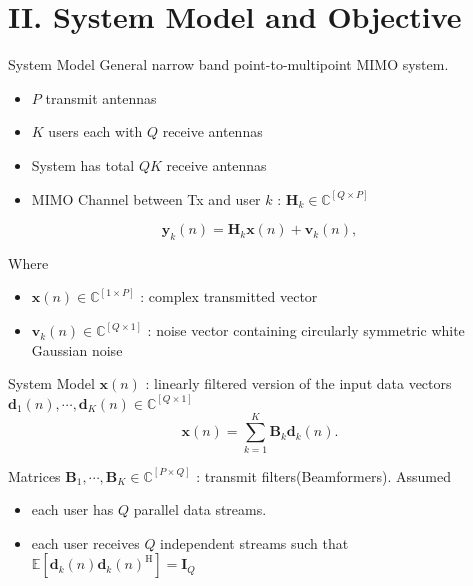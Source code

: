 \documentclass[aspectratio=169, 10pt]{beamer}
\begin{document}
\section{II. System Model and Objective}

\begin{frame}{System Model}
    General narrow band point-to-multipoint MIMO system.

    \begin{itemize}
        \item $P$ transmit antennas
        \item $K$ users each with $Q$ receive antennas
        \item System has total $QK$ receive antennas
        \item MIMO Channel between Tx and user $k$ : $\mathbf{H}_k \in \mathbb{C}^{[Q \times P]}$
    \end{itemize}

    \begin{equation}
        \mathbf{y}_k(n) = \mathbf{H}_k \mathbf{x}(n) + \mathbf{v}_k(n), \tag{1}
    \end{equation}

    Where
    \begin{itemize}
        \item $\mathbf{x}(n) \in \mathbb{C}^{[1\times P]}$ : complex transmitted vector
        \item $\mathbf{v}_k(n) \in \mathbb{C}^{[Q\times 1]}$
              : noise vector containing circularly symmetric white Gaussian noise
    \end{itemize}

\end{frame}

\begin{frame}{System Model}
    $\mathbf{x}(n)$ : linearly filtered version of the input data vectors
    $\mathbf{d}_1(n), \cdots , \mathbf{d}_K(n) \in \mathbb{C}^{[Q\times 1]}$
    \begin{equation}
        \mathbf{x}(n) = \sum_{k=1}^K \mathbf{B}_k \mathbf{d}_k(n). \tag{2}
    \end{equation}

    Matrices $\mathbf{B}_1, \cdots , \mathbf{B}_K \in \mathbb{C}^{[P\times Q]}$
    : transmit filters(Beamformers). Assumed
    \begin{itemize}
        \item each user has $Q$ parallel data streams.
        \item each user receives $Q$ independent streams such that
              $\mathbb{E}[ \mathbf{d}_k(n)\mathbf{d}_k(n)^\mathrm{H}] = \mathbf{I}_Q$
    \end{itemize}

\end{frame}
\end{document}
